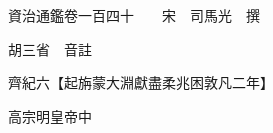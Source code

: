 










 


 
 


 

  
  
  
  
  





  
  
  
  
  
 
  

  

  
  
  



  

 
 

  
   




  

  
  


  　　資治通鑑卷一百四十　　宋　司馬光　撰

　　胡三省　音註

　　齊紀六【起旃蒙大淵獻盡柔兆困敦凡二年】

　　高宗明皇帝中


